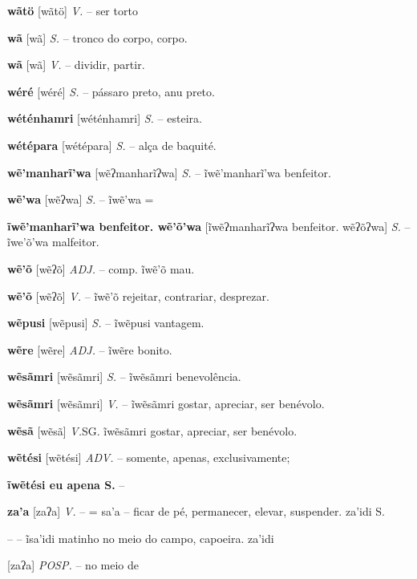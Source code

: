 {{{{{{{{{{{{{\textbf{wãtö} [wãtö] \textit{V.} -- {ser torto}

\textbf{wã} [wã] \textit{S.} -- tronco do corpo, corpo.

\textbf{wã} [wã] \textit{V.} -- dividir, partir.

\textbf{wéré} [wéré] \textit{S.} -- pássaro preto, anu preto.

\textbf{wéténhamri} [wéténhamri] \textit{S.} -- esteira.

\textbf{wétépara} [wétépara] \textit{S.} -- alça de baquité.

\textbf{wẽ'manharĩ'wa} [wẽʔmanharĩʔwa] \textit{S.} -- ĩwẽ'manharĩ'wa benfeitor.

\textbf{wẽ'wa} [wẽʔwa] \textit{S.} -- ĩwẽ'wa =

\textbf{ĩwẽ'manharĩ'wa benfeitor. wẽ'õ'wa} [ĩwẽʔmanharĩʔwa benfeitor. wẽʔõʔwa] \textit{S.} -- ĩwe'õ'wa malfeitor.

\textbf{wẽ'õ} [wẽʔõ] \textit{ADJ.} -- comp. ĩwẽ'õ mau.

\textbf{wẽ'õ} [wẽʔõ] \textit{V.} -- ĩwẽ'õ rejeitar, contrariar, desprezar.

\textbf{wẽpusi} [wẽpusi] \textit{S.} -- ĩwẽpusi vantagem.

\textbf{wẽre} [wẽre] \textit{ADJ.} -- ĩwẽre bonito.

\textbf{wẽsãmri} [wẽsãmri] \textit{S.} -- ĩwẽsãmri benevolência.

\textbf{wẽsãmri} [wẽsãmri] \textit{V.} -- ĩwẽsãmri gostar, apreciar, ser benévolo.

\textbf{wẽsã} [wẽsã] \textit{V.}SG. ĩwẽsãmri gostar, apreciar, ser benévolo.

\textbf{wẽtési} [wẽtési] \textit{ADV.} -- somente, apenas, exclusivamente;

\textbf{ĩwẽtési eu apena S.} -- \n%

\textbf{za'a} [zaʔa] \textit{V.} -- = sa'a -- ficar de pé, permanecer, elevar, suspender. za'idi S.} -- -- ĩsa'idi matinho no meio do campo, capoeira. za'idi} [zaʔa] \textit{POSP.} -- no meio de

}}}}}}}}}}}
